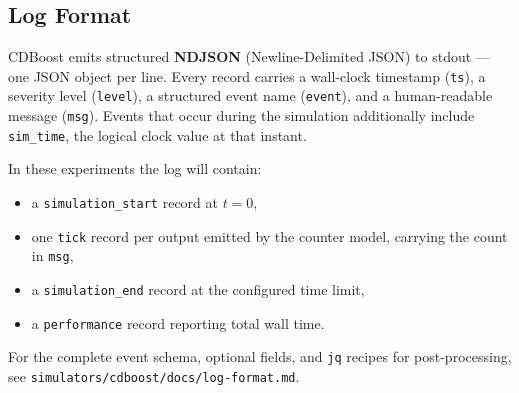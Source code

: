 \subsection*{Log Format}

CDBoost emits structured \textbf{NDJSON} (Newline-Delimited JSON) to
stdout --- one JSON object per line.  Every record carries a
wall-clock timestamp (\texttt{ts}), a severity level (\texttt{level}),
a structured event name (\texttt{event}), and a human-readable message
(\texttt{msg}).  Events that occur during the simulation additionally
include \texttt{sim\_time}, the logical clock value at that instant.

In these experiments the log will contain:
\begin{itemize}
  \item a \texttt{simulation\_start} record at $t = 0$,
  \item one \texttt{tick} record per output emitted by the counter
        model, carrying the count in \texttt{msg},
  \item a \texttt{simulation\_end} record at the configured time limit,
  \item a \texttt{performance} record reporting total wall time.
\end{itemize}

For the complete event schema, optional fields, and \texttt{jq}
recipes for post-processing, see
\texttt{simulators/cdboost/docs/log-format.md}.
